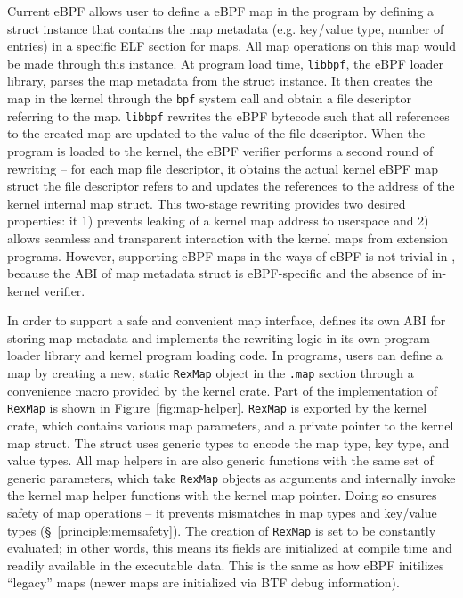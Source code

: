 Current eBPF allows user to define a eBPF map in the program by defining a
    struct instance that contains the map metadata (e.g. key/value type, number
    of entries) in a specific ELF section for maps.
All map operations on this map would be made through this instance.
At program load time, \texttt{libbpf}, the eBPF loader library, parses the map
    metadata from the struct instance.
It then creates the map in the kernel through the \texttt{bpf} system call and
    obtain a file descriptor referring to the map.
\texttt{libbpf} rewrites the eBPF bytecode such that all references to the
    created map are updated to the value of the file descriptor.
When the program is loaded to the kernel, the eBPF verifier performs a second
    round of rewriting -- for each map file descriptor, it obtains the actual
    kernel eBPF map struct the file descriptor refers to and updates the
    references to the address of the kernel internal map struct.
This two-stage rewriting provides two desired properties: it 1) prevents
    leaking of a kernel map address to userspace and 2) allows seamless and
    transparent interaction with the kernel maps from extension programs.
However, supporting eBPF maps in the ways of eBPF is not trivial in
    \projname{}, because the ABI of map metadata struct is eBPF-specific and
    the absence of in-kernel verifier.

In order to support a safe and convenient map interface, \projname{} defines
    its own ABI for storing map metadata and implements the rewriting logic in
    its own program loader library and kernel program loading code.
In \projname{} programs, users can define a map by creating a new, static
    \texttt{RexMap} object in the \texttt{.map} section through a convenience
    macro provided by the \projname{} kernel crate.
Part of the implementation of \texttt{RexMap} is shown in
    Figure~\ref{fig:map-helper}.
\texttt{RexMap} is exported by the \projname{} kernel crate, which contains
    various map parameters, and a private pointer to the kernel map struct.
The struct uses generic types to encode the map type, key type, and
    value types.
All map helpers in \projname{} are also generic functions with the same set of
    generic parameters, which take \texttt{RexMap} objects as arguments and
    internally invoke the kernel map helper functions with the kernel map
    pointer.
Doing so ensures safety of map operations -- it prevents mismatches in map
    types and key/value types (\S~\ref{principle:memsafety}).
The creation of \texttt{RexMap} is set to be constantly evaluated; in other
    words, this means its fields are initialized at compile time and readily
    available in the executable data.
This is the same as how eBPF initilizes ``legacy'' maps (newer maps are
    initialized via BTF debug information).

